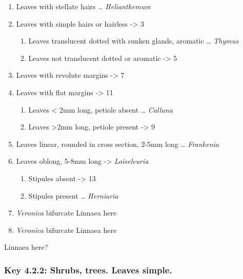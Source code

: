 \documentclass[openany]{book}
\providecommand{\tightlist}{%
  \setlength{\itemsep}{0pt}\setlength{\parskip}{0pt}}
\begin{document}
\begin{enumerate}
\def\labelenumi{\arabic{enumi}.}
\tightlist
\item
  Leaves with stellate hairs \ldots{} \emph{Helianthemum}
\item
  Leaves with simple hairs or hairless -\textgreater{} 3

  \begin{enumerate}
  \def\labelenumii{\arabic{enumii}.}
  \setcounter{enumii}{2}
  \tightlist
  \item
    Leaves translucent dotted with sunken glands, aromatic \ldots{}
    \emph{Thymus}
  \item
    Leaves not translucent dotted or aromatic -\textgreater{} 5
  \end{enumerate}
\item
  Leaves with revolute margins -\textgreater{} 7
\item
  Leaves with flat margins -\textgreater{} 11

  \begin{enumerate}
  \def\labelenumii{\arabic{enumii}.}
  \setcounter{enumii}{6}
  \tightlist
  \item
    Leaves \textless{} 2mm long, petiole absent \ldots{} \emph{Calluna}
  \item
    Leaves \textgreater{}2mm long, petiole present -\textgreater{} 9
  \end{enumerate}
\item
  Leaves linear, rounded in cross section, 2-5mm long \ldots{}
  \emph{Frankenia}
\item
  Leaves oblong, 5-8mm long -\textgreater{} \emph{Loiseleuria}

  \begin{enumerate}
  \def\labelenumii{\arabic{enumii}.}
  \setcounter{enumii}{10}
  \tightlist
  \item
    Stipules absent -\textgreater{} 13
  \item
    Stipules present \ldots{} \emph{Herniaria}
  \end{enumerate}
\item
  \emph{Veronica} bifurcate Linnaea here
\item
  \emph{Veronica} bifurcate Linnaea here
\end{enumerate}

Linnaea here?

\hypertarget{key-4.2.2-shrubs-trees.-leaves-simple.-1}{%
\subsubsection{Key 4.2.2: Shrubs, trees. Leaves
simple.}\label{key-4.2.2-shrubs-trees.-leaves-simple.-1}}
\end{document}
